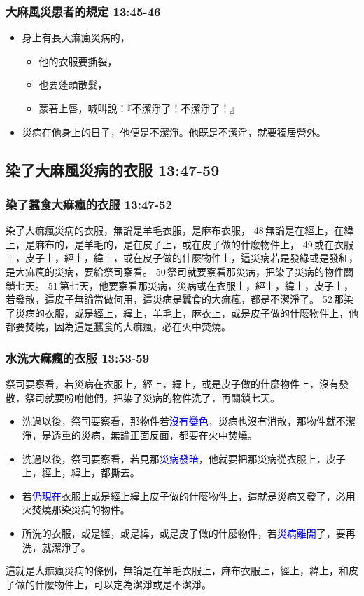 \subsubsection{大麻風災患者的規定 13:45-46}
\begin{itemize} 
\itemsep-.35em 
\item 身上有長大痲瘋災病的，
\begin{itemize} 
\itemsep-.35em 
\item 他的衣服要撕裂，
\item 也要蓬頭散髮，
\item 蒙著上唇，喊叫說：『不潔淨了！不潔淨了！』
\end{itemize}
\item 災病在他身上的日子，他便是不潔淨。他既是不潔淨，就要獨居營外。
\end{itemize}
 	
\subsection{染了大麻風災病的衣服 13:47-59}
\subsubsection{染了蠶食大痲瘋的衣服 13:47-52}
染了大痲瘋災病的衣服，無論是羊毛衣服，是麻布衣服， 48 無論是在經上，在緯上，是麻布的，是羊毛的，是在皮子上，或在皮子做的什麼物件上， 49 或在衣服上，皮子上，經上，緯上，或在皮子做的什麼物件上，這災病若是發綠或是發紅，是大痲瘋的災病，要給祭司察看。 50 祭司就要察看那災病，把染了災病的物件關鎖七天。 51 第七天，他要察看那災病，災病或在衣服上，經上，緯上，皮子上，若發散，這皮子無論當做何用，這災病是蠶食的大痲瘋，都是不潔淨了。 52 那染了災病的衣服，或是經上，緯上，羊毛上，麻衣上，或是皮子做的什麼物件上，他都要焚燒，因為這是蠶食的大痲瘋，必在火中焚燒。

\subsubsection{水洗大痲瘋的衣服 13:53-59}
祭司要察看，若災病在衣服上，經上，緯上，或是皮子做的什麼物件上，沒有發散，祭司就要吩咐他們，把染了災病的物件洗了，再關鎖七天。 
\begin{itemize} 
\itemsep-.35em 
\item 洗過以後，祭司要察看，那物件若\textcolor{blue}{沒有變色}，災病也沒有消散，那物件就不潔淨，是透重的災病，無論正面反面，都要在火中焚燒。
\item 洗過以後，祭司要察看，若見那\textcolor{blue}{災病發暗}，他就要把那災病從衣服上，皮子上，經上，緯上，都撕去。
\item 若\textcolor{blue}{仍現在}衣服上或是經上緯上皮子做的什麼物件上，這就是災病又發了，必用火焚燒那染災病的物件。
\item 所洗的衣服，或是經，或是緯，或是皮子做的什麼物件，若\textcolor{blue}{災病離開}了，要再洗，就潔淨了。
\end{itemize}
這就是大痲瘋災病的條例，無論是在羊毛衣服上，麻布衣服上，經上，緯上，和皮子做的什麼物件上，可以定為潔淨或是不潔淨。

